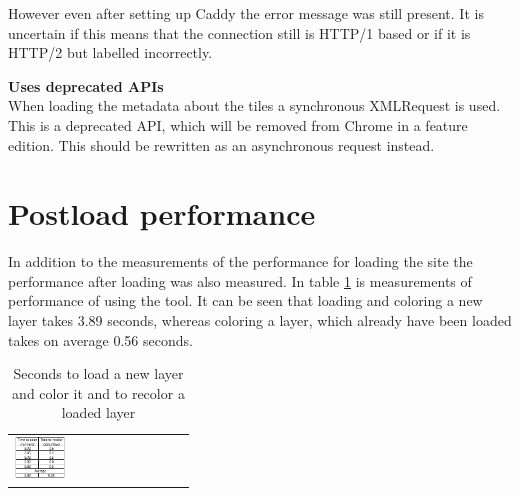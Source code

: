 However even after setting up Caddy the error message was still present. It is uncertain if this means that the connection still is HTTP/1 based or if it is HTTP/2 but labelled incorrectly. 

\textbf{Uses deprecated APIs}\\
When loading the metadata about the tiles a synchronous XMLRequest is used. This is a deprecated API, which will be removed from Chrome in a feature edition. This should be rewritten as an asynchronous request instead.
\citep{OldApis}

\section{Postload performance}

In addition to the measurements of the performance for loading the site the performance after loading was also measured. In table \ref{tabPostloadPerformance} is measurements of performance of using the tool. It can be seen that loading and coloring a new layer takes 3.89 seconds, whereas coloring a layer, which already have been loaded takes on average 0.56 seconds. 

\begin{table}[htbp]
	\centering
	\begin{tabular}{l}
		\includegraphics[width=0.3\textwidth]{Pictures/tabPostloadPerformance}
	\end{tabular}
	\caption{Seconds to load a new layer and color it and to recolor a loaded layer}
	\label{tabPostloadPerformance}
\end{table}